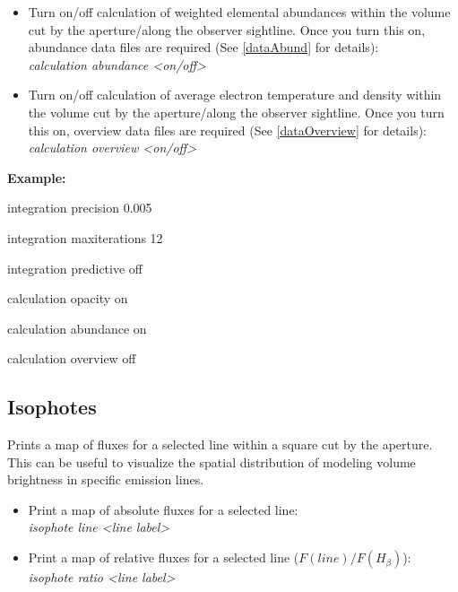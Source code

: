\documentclass[a4paper]{article}
\begin{document}
\begin{itemize}
    \item Turn on/off calculation of weighted elemental abundances within the volume cut by the aperture/along the observer sightline. Once you turn this on,
    abundance data files are required (See \ref{dataAbund} for details): \\
    \hspace*{0.25cm} {\it calculation abundance <on/off>}
    \item Turn on/off calculation of average electron temperature and density within the volume cut by the aperture/along the observer sightline. Once you turn this on,
    overview data files are required (See \ref{dataOverview} for details): \\
    \hspace*{0.25cm} {\it calculation overview <on/off>}
\end{itemize}

{\bf Example:}
\vspace{0.25cm}

\hspace*{0.25cm} integration precision 0.005
\vspace{0.1cm}

\hspace*{0.25cm} integration maxiterations 12
\vspace{0.1cm}

\hspace*{0.25cm} integration predictive off
\vspace{0.1cm}

\hspace*{0.25cm} calculation opacity on
\vspace{0.1cm}

\hspace*{0.25cm} calculation abundance on
\vspace{0.1cm}

\hspace*{0.25cm} calculation overview off

\subsection{Isophotes}
Prints a map of fluxes for a selected line within a square cut by the aperture. \\
This can be useful to visualize the spatial distribution of modeling volume brightness in specific emission lines. \\
\begin{itemize}
    \item Print a map of absolute fluxes for a selected line: \\
    \hspace*{0.25cm} {\it isophote line <line label>}
    \item Print a map of relative fluxes for a selected line  ($F(line)/F(H_{\beta})$): \\
    \hspace*{0.25cm} {\it isophote ratio <line label>}
\end{itemize}
\end{document}

